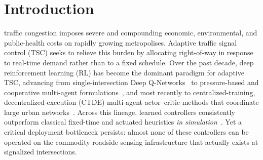 \section{Introduction}

 traffic congestion imposes severe and compounding economic, environmental, and public-health costs on rapidly growing metropolises. Adaptive traffic signal control (TSC) seeks to relieve this burden by allocating right-of-way in response to real-time demand rather than to a fixed schedule. Over the past decade, deep reinforcement learning (RL) has become the dominant paradigm for adaptive TSC, advancing from single-intersection Deep Q-Networks~\cite{wei2018_intellilight,genders2016_drl}
to pressure-based and cooperative multi-agent formulations~\cite{wei2019_presslight,wei2019_colight,chen2020_mplight}, and most recently to centralized-training, decentralized-execution (CTDE) multi-agent actor--critic methods that coordinate large urban
networks~\cite{yu2022_mappo,mao2023_masac,zhou2024_micdrl,gu2024_partition}. Across this lineage, learned controllers consistently outperform classical fixed-time and actuated heuristics \emph{in simulation}~\cite{wei2019_survey,rltsc_review2025,rltsc_survey2026}. Yet a critical deployment bottleneck persists: almost none of these controllers can be operated on the commodity roadside sensing infrastructure that actually exists at signalized intersections.

